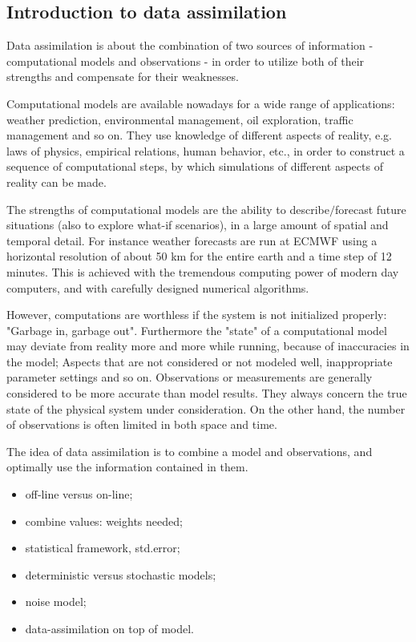 \subsection{Introduction to data assimilation}
Data assimilation is about the combination of two sources of information - computational models and observations - in order to utilize both of their strengths and compensate for their weaknesses.

Computational models are available nowadays for a wide range of applications: weather prediction, environmental management, oil exploration, traffic management and so on. They use knowledge of different aspects of reality, e.g. laws of physics, empirical relations, human behavior, etc., in order to construct a sequence of computational steps, by which simulations of different aspects of reality can be made.

The strengths of computational models are the ability to describe$/$forecast future situations (also to explore what-if scenarios), in a large amount of spatial and temporal detail. For instance weather forecasts are run at ECMWF using a horizontal resolution of about 50 km for the entire earth and a time step of 12 minutes. This is achieved with the tremendous computing power of modern day computers, and with carefully designed numerical algorithms.

However, computations are worthless if the system is not initialized properly: "Garbage in, garbage out". Furthermore the "state" of a computational model may deviate from reality more and more while running, because of inaccuracies in the model; Aspects that are not considered or not modeled well, inappropriate parameter settings and so on. Observations or measurements are generally considered to be more accurate than model results. They always concern the true state of the physical system under consideration. On the other hand, the number of observations is often limited in both space and time.

The idea of data assimilation is to combine a model and observations, and optimally use the information contained in them.

\begin{itemize}
    \item off-line versus on-line;
    \item combine values: weights needed;
    \item statistical framework, std.error;
    \item deterministic versus stochastic models;
    \item noise model;
    \item data-assimilation on top of model.
\end{itemize}

